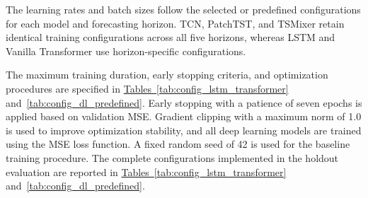 \documentclass[runningheads,orivec]{llncs}
\begin{document}
The learning rates and batch sizes follow the selected or predefined configurations for each model and forecasting horizon. TCN, PatchTST, and TSMixer retain identical training configurations across all five horizons, whereas LSTM and Vanilla Transformer use horizon-specific configurations.

The maximum training duration, early stopping criteria, and optimization procedures are specified in \hyperref[tab:config_lstm_transformer]{Tables~\ref*{tab:config_lstm_transformer}} and~\hyperref[tab:config_dl_predefined]{\ref*{tab:config_dl_predefined}}. Early stopping with a patience of seven epochs is applied based on validation MSE. Gradient clipping with a maximum norm of 1.0 is used to improve optimization stability, and all deep learning models are trained using the MSE loss function. A fixed random seed of 42 is used for the baseline training procedure. The complete configurations implemented in the holdout evaluation are reported in \hyperref[tab:config_lstm_transformer]{Tables~\ref*{tab:config_lstm_transformer}} and~\hyperref[tab:config_dl_predefined]{\ref*{tab:config_dl_predefined}}.
\end{document}
